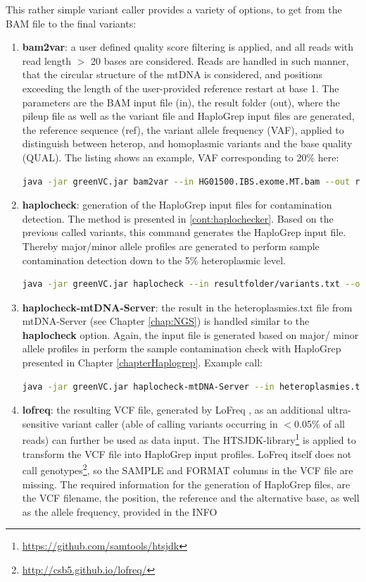 This rather simple variant caller provides a variety of options, to get from the BAM file to the final variants:
\begin{enumerate}
\item \textbf{bam2var}: a user defined quality score filtering is applied, and all reads with read length $>$ 20 bases are considered. Reads are handled in such manner, that the circular structure of the mtDNA is considered, and positions exceeding the length of the user-provided reference restart at base 1. 
The parameters are the BAM input file (in), the result folder (out), where the pileup file as well as the variant file and HaploGrep input files are generated, the reference sequence (ref), the variant allele frequency (VAF), applied to distinguish between heterop, and homoplasmic variants and the base quality (QUAL). The listing shows an example, VAF corresponding to 20\% here:
\begin{lstlisting}[language=bash]
java -jar greenVC.jar bam2var --in HG01500.IBS.exome.MT.bam --out resultfolder  --ref data/rcrs.fasta  --VAF 0.2 --QUAL 20
\end{lstlisting}
\item \textbf{haplocheck}: generation of the HaploGrep input files for contamination detection. The method is presented in \ref{cont:haplochecker}. Based on the previous called variants, this command generates the HaploGrep input file. Thereby major/minor allele profiles are generated to perform sample contamination detection down to the 5\% heteroplasmic level.
\begin{lstlisting}[language=bash]
java -jar greenVC.jar haplocheck --in resultfolder/variants.txt --out haplogrepinput.hsd   --VAF 0.05 
\end{lstlisting}
\item \textbf{haplocheck-mtDNA-Server}: the result in the heteroplasmies.txt file from mtDNA-Server (see Chapter \ref{chap:NGS}) is handled similar to the \textbf{haplocheck} option. Again, the input file is generated based on major/ minor allele profiles in perform the sample contamination check with HaploGrep presented in Chapter \ref{chapterHaplogrep}. Example call:
\begin{lstlisting}[language=bash]
java -jar greenVC.jar haplocheck-mtDNA-Server --in heteroplasmies.txt --out haplogrepinput.hsd  --VAF 0.05 
\end{lstlisting}
\item \textbf{lofreq}: the resulting VCF file, generated by LoFreq \cite{Wilm2012}, as an additional ultra-sensitive variant caller (able of calling variants occurring in $<$0.05\% of all reads) can further be used as data input. The HTSJDK-library\footnote{\url{https://github.com/samtools/htsjdk}} is applied to transform the VCF file into HaploGrep input profiles. LoFreq itself does not call genotypes\footnote{\url{http://csb5.github.io/lofreq/}}, so the SAMPLE and FORMAT columns in the VCF file are missing. The required information for the generation of HaploGrep files, are the VCF filename, the position, the reference and the alternative base, as well as the allele frequency, provided in the INFO

\end{enumerate}

